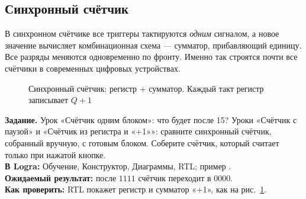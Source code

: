 \subsection{Синхронный счётчик}

В синхронном счётчике все триггеры тактируются \emph{одним} сигналом, а новое
значение вычисляет комбинационная схема --- сумматор, прибавляющий единицу.
Все разряды меняются одновременно по фронту. Именно так строятся почти все
счётчики в современных цифровых устройствах.

\begin{figure}[H]
\centering
{}
\caption{Синхронный счётчик: регистр + сумматор. Каждый такт регистр
записывает $Q+1$}
\label{fig:sync_counter}
\end{figure}

\begin{diybox}[Счётчик]
\textbf{Задание.}  Урок «Счётчик одним блоком»: что будет после 15?
 Уроки «Счётчик с паузой» и «Счётчик из регистра и «+1»»: сравните
синхронный счётчик, собранный вручную, с готовым блоком.  Соберите
счётчик, который считает только при нажатой кнопке.\\
\textbf{В Logra:} Обучение, Конструктор, Диаграммы, RTL; пример
.\\
\textbf{Ожидаемый результат:} после $1111$ счётчик переходит в $0000$.\\
\textbf{Как проверить:} RTL покажет регистр и сумматор «+1», как на
рис.~\ref{fig:sync_counter}.
\end{diybox}

